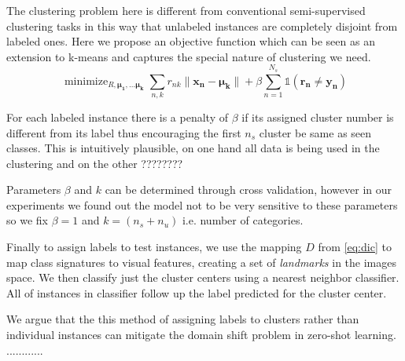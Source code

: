 \documentclass[wcp]{jmlr}
\DeclareMathOperator*{\minimize}{minimize}
\begin{document}
The clustering problem here is different from conventional semi-supervised clustering tasks \cite{}
in this way that unlabeled instances are completely disjoint from labeled ones. Here we propose an objective function which
can be seen as an extension to k-means and captures the special nature of clustering we need.
\begin{equation}
\minimize_{R, \mathbf{\mu_1, \ldots \mu_k }}  \sum_{n,k} r_{nk} \lVert \mathbf{x_n - \mu_k} \rVert +
 \beta \sum_{n=1}^{N_s} \mathds{1}(\mathbf{r_n \neq y_n})
\end{equation}

For each labeled instance there is a penalty of $\beta$ if its assigned cluster number is different from its label thus encouraging
the first $n_s$ cluster be same as seen classes. This is intuitively plausible, on one hand all data is being used
in the clustering and on the other ????????

Parameters $\beta$ and $k$ can be determined through cross validation, however in our experiments we found out
the model not to be very sensitive to these parameters so we fix $\beta=1$ and $k =  (n_s + n_u)$ i.e. number of categories.

Finally to assign labels to test instances, we use the mapping $D$ from \eqref{eq:dic} to map class signatures to visual
features, creating a set of \textit{landmarks} in the images space. We then classify just the cluster centers using a
nearest neighbor classifier. All of instances in classifier follow up the label predicted for the cluster center.

We argue that the this method of assigning labels to clusters rather than individual instances can mitigate the
domain shift problem in zero-shot learning.
............
\end{document}
